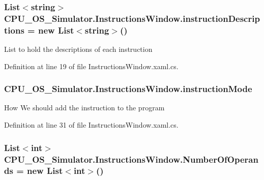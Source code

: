 \subsubsection[{instruction\+Descriptions}]{\setlength{\rightskip}{0pt plus 5cm}List$<$string$>$ C\+P\+U\+\_\+\+O\+S\+\_\+\+Simulator.\+Instructions\+Window.\+instruction\+Descriptions = new List$<$string$>$()\hspace{0.3cm}{\ttfamily [private]}}\label{class_c_p_u___o_s___simulator_1_1_instructions_window_a678ab4df2b78758142472eeed8c5d7ba}


List to hold the descriptions of each instruction 



Definition at line 19 of file Instructions\+Window.\+xaml.\+cs.

\hypertarget{class_c_p_u___o_s___simulator_1_1_instructions_window_aae7addf8e362e26e981b36b9940a53c0}{}
\subsubsection[{instruction\+Mode}]{ C\+P\+U\+\_\+\+O\+S\+\_\+\+Simulator.\+Instructions\+Window.\+instruction\+Mode\hspace{0.3cm}{\ttfamily [private]}}\label{class_c_p_u___o_s___simulator_1_1_instructions_window_aae7addf8e362e26e981b36b9940a53c0}


How We should add the instruction to the program 



Definition at line 31 of file Instructions\+Window.\+xaml.\+cs.

\hypertarget{class_c_p_u___o_s___simulator_1_1_instructions_window_a6a10065d655000cc37a281b242fb7fb5}{}
\subsubsection[{Number\+Of\+Operands}]{\setlength{\rightskip}{0pt plus 5cm}List$<$int$>$ C\+P\+U\+\_\+\+O\+S\+\_\+\+Simulator.\+Instructions\+Window.\+Number\+Of\+Operands = new List$<$int$>$()\hspace{0.3cm}{\ttfamily [private]}}\label{class_c_p_u___o_s___simulator_1_1_instructions_window_a6a10065d655000cc37a281b242fb7fb5}


